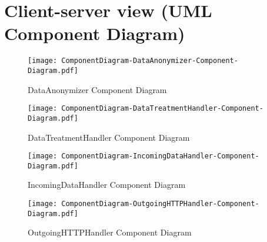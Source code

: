 
\makeatletter{}\makeatother
\makeatletter{}\makeatother



\chapter{Client-server view (UML Component Diagram)}
\minilof{}







\begin{figure}[!htp]
  \centering
  \texttt{[image: ComponentDiagram-DataAnonymizer-Component-Diagram.pdf]}
  \caption[DataAnonymizer Component Diagram]{DataAnonymizer Component Diagram \label{diag:Component:DataAnonymizerComponentDiagram}}
\end{figure}


\begin{figure}[!htp]
  \centering
  \texttt{[image: ComponentDiagram-DataTreatmentHandler-Component-Diagram.pdf]}
  \caption[DataTreatmentHandler Component Diagram]{DataTreatmentHandler Component Diagram \label{diag:Component:DataTreatmentHandlerComponentDiagram}}
\end{figure}


\begin{figure}[!htp]
  \centering
  \texttt{[image: ComponentDiagram-IncomingDataHandler-Component-Diagram.pdf]}
  \caption[IncomingDataHandler Component Diagram]{IncomingDataHandler Component Diagram \label{diag:Component:IncomingDataHandlerComponentDiagram}}
\end{figure}


\begin{figure}[!htp]
  \centering
  \texttt{[image: ComponentDiagram-OutgoingHTTPHandler-Component-Diagram.pdf]}
  \caption[OutgoingHTTPHandler Component Diagram]{OutgoingHTTPHandler Component Diagram \label{diag:Component:OutgoingHTTPHandlerComponentDiagram}}
\end{figure}

